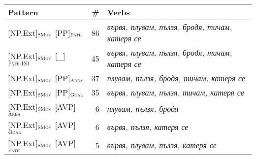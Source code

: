 \documentclass[output=paper,colorlinks,citecolor=brown]{langscibook}
\begin{document}
\begin{table}
   \begin{tabularx}{\textwidth}{lrQ} 
   \lsptoprule
   Pattern & \# & Verbs \\ \midrule
{[NP.Ext]}$_{\text{\textsc{SMov}}}$ {[PP]}$_{\text{\textsc{Path}}}$ & 86 & \textit{вървя, плувам, пълзя, бродя, тичам, катеря се}\\ 
{[NP.Ext]}$_{\text{\textsc{SMov}}}$ {[\_]}$_{\text{\textsc{Path-INI}}}$ & 45 & \textit{вървя, плувам, пълзя, бродя, тичам, катеря се}\\ 
{[NP.Ext]}$_{\text{\textsc{SMov}}}$ {[PP]}$_{\text{\textsc{Area}}}$ & 37 & \textit{плувам, пълзя, бродя, тичам, катеря се}\\ 
{[NP.Ext]}$_{\text{\textsc{SMov}}}$ {[PP]}$_{\text{\textsc{Goal}}}$ & 35 & \textit{вървя, плувам, пълзя, тичам, катеря се}\\ 
{[NP.Ext]}$_{\text{\textsc{SMov}}}$ {[AVP]}$_{\text{\textsc{Area}}}$ & 6 & \textit{плувам, пълзя, бродя}\\ 
{[NP.Ext]}$_{\text{\textsc{SMov}}}$ {[AVP]}$_{\text{\textsc{Goal}}}$ & 6 & \textit{вървя, пълзя, катеря се}\\ 
{[NP.Ext]}$_{\text{\textsc{SMov}}}$ {[AVP]}$_{\text{\textsc{Path}}}$ & 5 & \textit{вървя, плувам, пълзя, катеря се}\\ 

\end{tabularx}
\end{table}
\end{document}
